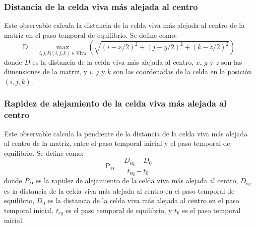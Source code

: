 \subsubsection{Distancia de la celda viva más alejada al centro}\label{subsubsec:distancia-de-la-celda-viva-mas-alejada-al-centro}
Este observable calcula la distancia de la celda viva más alejada al centro de la matriz
en el paso temporal de equilibrio.
Se define como:
\begin{equation}
    \text{D} = \max_{i, j, k | (i, j, k) \in \text{Viva}} \left( \sqrt{(i - x/2)^2 + (j - y/2)^2 + (k - z/2)^2} \right)
    \label{eq:distancia-celda-viva-mas-alejada-al-centro}
\end{equation}
donde $D$ es la distancia de la celda viva más alejada al centro, $x$, $y$ y $z$ son las dimensiones de la matriz,
y $i$, $j$ y $k$ son las coordenadas de la celda en la posición $(i, j, k)$.

\subsubsection{Rapidez de alejamiento de la celda viva más alejada al centro}\label{subsubsec:rapidez-de-alejamiento-de-la-celda-viva-mas-alejada-al-centro}
Este observable calcula la pendiente de la distancia de la celda viva más alejada al centro de la matriz,
entre el paso temporal inicial y el paso temporal de equilibrio.
Se define como:
\begin{equation}
    \text{P}_{\text{D}} = \frac{D_{\text{eq}} - D_{0}}{t_{\text{eq}} - t_{0}}
    \label{eq:rapidez-alejamiento-celda-viva-mas-alejada-al-centro}
\end{equation}
donde $P_{D}$ es la rapidez de alejamiento de la celda viva más alejada al centro, $D_{eq}$ es la
distancia de la celda viva más alejada al centro en el paso temporal de equilibrio, $D_{0}$ es la
distancia de la celda viva más alejada al centro en el paso temporal inicial, $t_{eq}$ es el paso
temporal de equilibrio, y $t_{0}$ es el paso temporal inicial.









